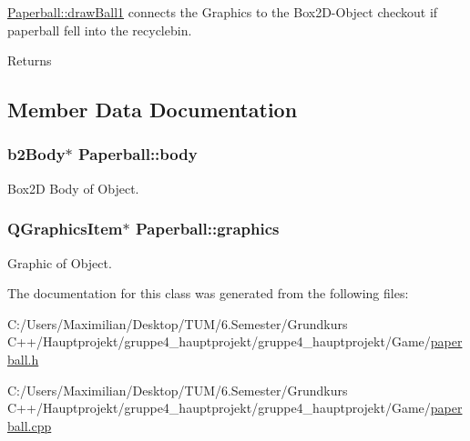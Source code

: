 \hyperlink{class_paperball_a3bb15d3327d35c3408fe7e5b06bce078}{Paperball\+::draw\+Ball1} connects the Graphics to the Box2\+D-\/\+Object checkout if paperball fell into the recyclebin. 

\begin{DoxyReturn}{Returns}

\end{DoxyReturn}


\subsection{Member Data Documentation}
\subsubsection[{\texorpdfstring{body}{body}}]{\setlength{\rightskip}{0pt plus 5cm}b2\+Body$\ast$ Paperball\+::body}\hypertarget{class_paperball_a5d5b3e0d4237ba80fe9590f49c88a0c0}{}\label{class_paperball_a5d5b3e0d4237ba80fe9590f49c88a0c0}


Box2D Body of Object. 

\subsubsection[{\texorpdfstring{graphics}{graphics}}]{\setlength{\rightskip}{0pt plus 5cm}Q\+Graphics\+Item$\ast$ Paperball\+::graphics}\hypertarget{class_paperball_a87b4515e298699c840f541ee637215dd}{}\label{class_paperball_a87b4515e298699c840f541ee637215dd}


Graphic of Object. 



The documentation for this class was generated from the following files\+:\begin{DoxyCompactItemize}
\item 
C\+:/\+Users/\+Maximilian/\+Desktop/\+T\+U\+M/6.\+Semester/\+Grundkurs C++/\+Hauptprojekt/gruppe4\+\_\+hauptprojekt/gruppe4\+\_\+hauptprojekt/\+Game/\hyperlink{paperball_8h}{paperball.\+h}\item 
C\+:/\+Users/\+Maximilian/\+Desktop/\+T\+U\+M/6.\+Semester/\+Grundkurs C++/\+Hauptprojekt/gruppe4\+\_\+hauptprojekt/gruppe4\+\_\+hauptprojekt/\+Game/\hyperlink{paperball_8cpp}{paperball.\+cpp}\end{DoxyCompactItemize}
